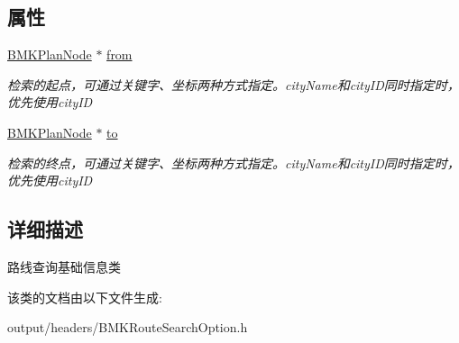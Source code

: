 \subsection*{属性}
\begin{DoxyCompactItemize}
\item 
\hypertarget{interface_b_m_k_base_route_plan_option_afb4bc6a8468e1bf3dbb24c86abf06827}{}\hyperlink{interface_b_m_k_plan_node}{B\+M\+K\+Plan\+Node} $\ast$ \hyperlink{interface_b_m_k_base_route_plan_option_afb4bc6a8468e1bf3dbb24c86abf06827}{from}\label{interface_b_m_k_base_route_plan_option_afb4bc6a8468e1bf3dbb24c86abf06827}

\begin{DoxyCompactList}\small\item\em 检索的起点，可通过关键字、坐标两种方式指定。city\+Name和city\+I\+D同时指定时，优先使用city\+I\+D \end{DoxyCompactList}\item 
\hypertarget{interface_b_m_k_base_route_plan_option_a6a01852ca226bdc1f580bb4a10745c62}{}\hyperlink{interface_b_m_k_plan_node}{B\+M\+K\+Plan\+Node} $\ast$ \hyperlink{interface_b_m_k_base_route_plan_option_a6a01852ca226bdc1f580bb4a10745c62}{to}\label{interface_b_m_k_base_route_plan_option_a6a01852ca226bdc1f580bb4a10745c62}

\begin{DoxyCompactList}\small\item\em 检索的终点，可通过关键字、坐标两种方式指定。city\+Name和city\+I\+D同时指定时，优先使用city\+I\+D \end{DoxyCompactList}\end{DoxyCompactItemize}


\subsection{详细描述}
路线查询基础信息类 

该类的文档由以下文件生成\+:\begin{DoxyCompactItemize}
\item 
output/headers/B\+M\+K\+Route\+Search\+Option.\+h\end{DoxyCompactItemize}
